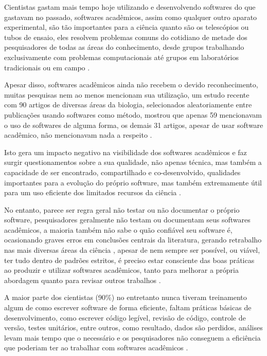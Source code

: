 Cientistas gastam mais tempo hoje utilizando e desenvolvendo softwares do que
gastavam no passado, softwares acadêmicos, assim como qualquer outro aparato
experimental, são tão importantes para a ciência quanto são os telescópios ou
tubos de ensaio, eles resolvem problemas comuns do cotidiano de metade dos
pesquisadores de todas as áreas do conhecimento, desde grupos trabalhando
exclusivamente com problemas computacionais até grupos em laboratórios
tradicionais ou em campo \cite{wilson2014best}.

Apesar disso, softwares acadêmicos ainda não recebem o devido reconhecimento,
muitas pesquisas nem ao menos mencionam sua utilização, um estudo recente com
90 artigos de diversas áreas da biologia, selecionados aleatoriamente entre
publicações usando softwares como método, mostrou que apenas 59 mencionavam o
uso de softwares de alguma forma, os demais 31 artigos, apesar de usar software
acadêmico, não mencionavam nada a respeito \cite{howison2016software}.

Isto gera um impacto negativo na visibilidade dos softwares acadêmicos e faz
surgir questionamentos sobre a sua qualidade, não apenas técnica, mas também a
capacidade de ser encontrado, compartilhado e co-desenvolvido, qualidades
importantes para a evolução do próprio software, mas também extremamente útil
para um uso eficiente dos limitados recursos da ciência \cite{howison2013,
katz2014transitive}.

No entanto, parece ser regra geral não testar ou não documentar o próprio
software, pesquisadores geralmente não testam ou documentam seus softwares
acadêmicos, a maioria também não sabe o quão confiável seu software é,
ocasionando graves erros em conclusões centrais da literatura,
gerando retrabalho nas mais diversas áreas da ciência \cite{Merali2010Computational},
apesar de nem sempre ser possível, ou viável, ter tudo dentro de
padrões estritos, é preciso estar consciente das boas práticas ao
produzir e utilizar softwares acadêmicos, tanto para melhorar a própria
abordagem quanto para revisar outros trabalhos \cite{wilson2014best}.

A maior parte dos cientistas (90\%) no entretanto nunca tiveram treinamento
algum de como escrever software de forma eficiente, faltam práticas básicas de
desenvolvimento, como escrever código legível, revisão de código, controle de
versão, testes unitários, entre outros, como resultado, dados são perdidos,
análises levam mais tempo que o necessário e os pesquisadores não conseguem a
eficiência que poderiam ter ao trabalhar com softwares acadêmicos
\cite{wilson2017good}.

